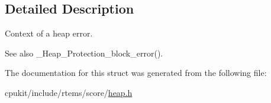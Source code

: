 \subsection{Detailed Description}
Context of a heap error. 

\begin{DoxySeeAlso}{See also}
\+\_\+\+Heap\+\_\+\+Protection\+\_\+block\+\_\+error(). 
\end{DoxySeeAlso}


The documentation for this struct was generated from the following file\+:\begin{DoxyCompactItemize}
\item 
cpukit/include/rtems/score/\mbox{\hyperlink{heap_8h}{heap.\+h}}\end{DoxyCompactItemize}
